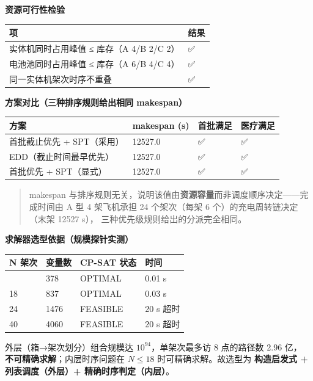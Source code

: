 \documentclass[
  10.5pt,
]{article}
\newcounter{none} %
\begin{document}
\textbf{资源可行性检验}

{\def\LTcaptype{none} %
\begin{longtable}[]{@{}ll@{}}
\toprule\noalign{}
项 & 结果 \\
\midrule\noalign{}
\endhead
\bottomrule\noalign{}
\endlastfoot
实体机同时占用峰值 ≤ 库存（A 4/B 2/C 2） & ✅ \\
电池池同时占用峰值 ≤ 库存（A 6/B 4/C 4） & ✅ \\
同一实体机架次时序不重叠 & ✅ \\
\end{longtable}
}

\textbf{方案对比（三种排序规则给出相同 makespan）}

{\def\LTcaptype{none} %
\begin{longtable}[]{@{}llll@{}}
\toprule\noalign{}
方案 & makespan (s) & 首批满足 & 医疗满足 \\
\midrule\noalign{}
\endhead
\bottomrule\noalign{}
\endlastfoot
首批截止优先 + SPT（采用） & 12527.0 & ✅ & ✅ \\
EDD（截止时间最早优先） & 12527.0 & ✅ & ✅ \\
首批优先 + SPT（显式） & 12527.0 & ✅ & ✅ \\
\end{longtable}
}

\begin{quote}
makespan
与排序规则无关，说明该值由\textbf{资源容量}而非调度顺序决定------完成时间由
A 型 4 架飞机承担 24 个架次（每架 6 个）的充电周转链决定（末架 12527
s）， 三种优先级规则给出的分派完全相同。
\end{quote}

\textbf{求解器选型依据（规模探针实测）}

{\def\LTcaptype{none} %
\begin{longtable}[]{@{}llll@{}}
\toprule\noalign{}
N 架次 & 变量数 & CP-SAT 状态 & 时间 \\
\midrule\noalign{}
\endhead
\bottomrule\noalign{}
\endlastfoot
12 & 378 & OPTIMAL & 0.01 s \\
18 & 837 & OPTIMAL & 0.03 s \\
24 & 1476 & FEASIBLE & 20 s 超时 \\
40 & 4060 & FEASIBLE & 20 s 超时 \\
\end{longtable}
}

外层（箱→架次划分）组合规模达 \(10^{94}\)，单架次最多访 8 点的路径数
2.96 亿， \textbf{不可精确求解}；内层时序问题在 \(N\le18\)
时可精确求解。故选型为 \textbf{构造启发式 + 列表调度（外层）+
精确时序判定（内层）}。
\end{document}

